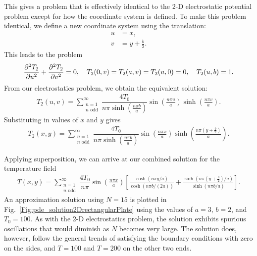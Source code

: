 This gives a problem that is effectively identical to the 2-D electrostatic potential problem except for how the coordinate system is defined. To make this problem identical, we define a new coordinate system using the translation:
\begin{subequations}
\begin{align}
  u &= x, \\
  v &= y + \frac{b}{2} .
\end{align}
\end{subequations}
This leads to the problem
\begin{align}
  \frac{ \partial^2 {T_2} }{ \partial {u}^2 } + \frac{ \partial^2 {T_2} }{ \partial {v}^2 } = 0, \quad T_2(0,v) = T_2(a,v) = T_2(u,0) = 0, \quad T_2(u,b) = 1 . 
\end{align}
From our electrostatics problem, we obtain the equivalent solution:
\begin{align}
  T_2(u,v) = \sum_{\substack{n=1 \\ n \text{ odd}}}^\infty  \dfrac{4 T_0}{n\pi \sinh ( \frac{n \pi b}{a} )} \sin \left( \frac{n\pi u}{a} \right) \sinh \left( \frac{n\pi v}{a} \right) .
\end{align}
Substituting in values of $x$ and $y$ gives
\begin{align}
  T_2(x,y) = \sum_{\substack{n=1 \\ n \text{ odd}}}^\infty  \dfrac{4 T_0}{n\pi \sinh ( \frac{n \pi b}{a} )} \sin \left( \frac{n\pi x}{a} \right) \sinh \left( \frac{n\pi ( y + \frac{b}{2} )}{a} \right) .
\end{align}

Applying superposition, we can arrive at our combined solution for the temperature field
\begin{align}
  T(x,y) =  \sum_{\substack{n=1 \\ n \text{ odd}}}^\infty  \dfrac{4 T_0}{n\pi} \sin \left( \frac{n\pi x}{a} \right)
  \left[ \frac{  \cosh \left( n\pi y / a \right) }{ \cosh ( n\pi b/(2 a) ) } + \frac{ \sinh \left( n\pi ( y + \frac{b}{2} )/a \right) }{ \sinh ( n \pi b/a ) } \right] .
\end{align}
An approximation solution using $N = 15$ is plotted in Fig.~\ref{Fig:pde_solution2DrectangularPlate} using the values of $a = 3$, $b = 2$, and $T_0 = 100$. As with the 2-D electrostatics problem, the solution exhibits spurious oscillations that would diminish as $N$ becomes very large. The solution does, however, follow the general trends of satisfying the boundary conditions with zero on the sides, and $T = 100$ and $T = 200$ on the other two ends.

